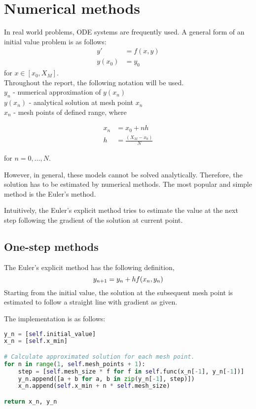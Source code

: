 \chapter{Numerical methods}
\label{chap:numerical-methods}
In real world problems, ODE systems are frequently used. A general form of an initial value problem is as follows: 
\begin{align}
    y'&=f(x,y)\\
    y(x_0) &= y_0
\end{align}
for $x \in [x_0, X_M]$. \\

Throughout the report, the following notation will be used. \\
$y_n$ - numerical approximation of $y(x_n)$ \\
$y(x_n)$ - analytical solution at mesh point $x_n$ \\
$x_n$ - mesh points of defined range, where

\begin{align}
    x_n &= x_0 + nh\\
    h &= \frac{(X_M - x_0)}{N}
\end{align}

for $n = 0,\dots, N$.

However, in general, these models cannot be solved analytically. Therefore, the solution has to be estimated by numerical methods. The most popular and simple method is the Euler's method.

Intuitively, the Euler's explicit method tries to estimate the value at the next step following the gradient of the solution at current point.

\section{One-step methods}
The Euler's explicit method has the following definition,  
\begin{equation}
    y_{n+1} = y_n + hf(x_n,y_n)\\
\end{equation}
Starting from the initial value, the solution at the subsequent mesh point is estimated to follow a straight line with gradient as given.

The implementation is as follows:
\begin{lstlisting}[language=Python]
y_n = [self.initial_value]
x_n = [self.x_min]

# Calculate approximated solution for each mesh point.
for n in range(1, self.mesh_points + 1):
    step = [self.mesh_size * f for f in self.func(x_n[-1], y_n[-1])]
    y_n.append([a + b for a, b in zip(y_n[-1], step)])
    x_n.append(self.x_min + n * self.mesh_size)

return x_n, y_n
\end{lstlisting}

